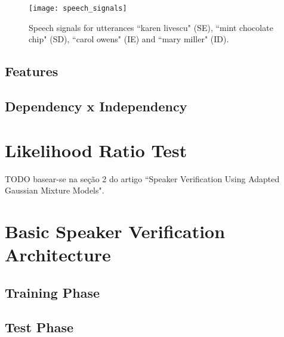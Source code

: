 \begin{figure}[ht]
    \centering
    \texttt{[image: speech\_signals]}
    \caption{Speech signals for utterances ``karen livescu" (SE), ``mint chocolate chip" (SD), ``carol owens" (IE) and ``mary miller" (ID).}
    \label{fig:speech_signals}
\end{figure}

\subsection{Features}

\subsection{Dependency x Independency}

\section{Likelihood Ratio Test}

TODO basear-se na seção 2 do artigo ``Speaker Verification Using Adapted Gaussian Mixture Models".

\section{Basic Speaker Verification Architecture}

\subsection{Training Phase}

\subsection{Test Phase}